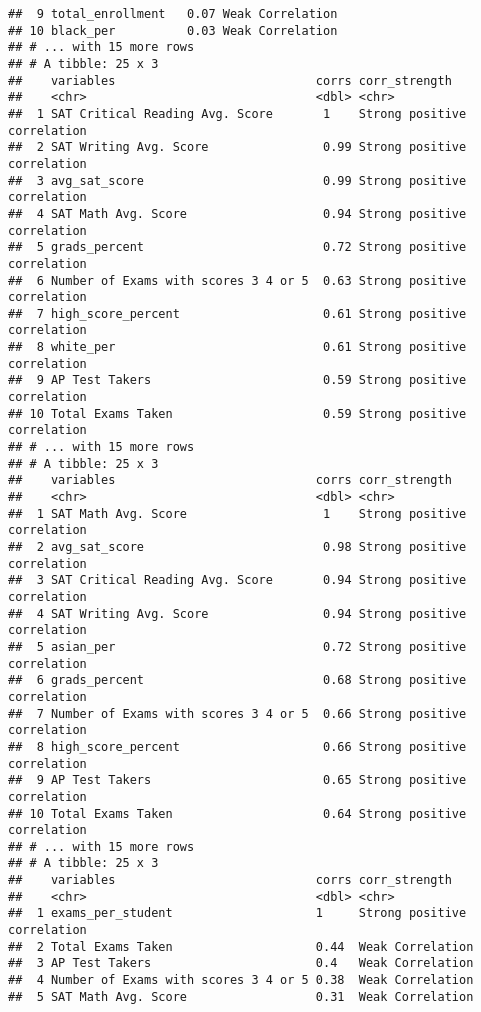 \documentclass[]{article}
\begin{document}
\begin{verbatim}
##  9 total_enrollment   0.07 Weak Correlation           
## 10 black_per          0.03 Weak Correlation           
## # ... with 15 more rows
## # A tibble: 25 x 3
##    variables                            corrs corr_strength              
##    <chr>                                <dbl> <chr>                      
##  1 SAT Critical Reading Avg. Score       1    Strong positive correlation
##  2 SAT Writing Avg. Score                0.99 Strong positive correlation
##  3 avg_sat_score                         0.99 Strong positive correlation
##  4 SAT Math Avg. Score                   0.94 Strong positive correlation
##  5 grads_percent                         0.72 Strong positive correlation
##  6 Number of Exams with scores 3 4 or 5  0.63 Strong positive correlation
##  7 high_score_percent                    0.61 Strong positive correlation
##  8 white_per                             0.61 Strong positive correlation
##  9 AP Test Takers                        0.59 Strong positive correlation
## 10 Total Exams Taken                     0.59 Strong positive correlation
## # ... with 15 more rows
## # A tibble: 25 x 3
##    variables                            corrs corr_strength              
##    <chr>                                <dbl> <chr>                      
##  1 SAT Math Avg. Score                   1    Strong positive correlation
##  2 avg_sat_score                         0.98 Strong positive correlation
##  3 SAT Critical Reading Avg. Score       0.94 Strong positive correlation
##  4 SAT Writing Avg. Score                0.94 Strong positive correlation
##  5 asian_per                             0.72 Strong positive correlation
##  6 grads_percent                         0.68 Strong positive correlation
##  7 Number of Exams with scores 3 4 or 5  0.66 Strong positive correlation
##  8 high_score_percent                    0.66 Strong positive correlation
##  9 AP Test Takers                        0.65 Strong positive correlation
## 10 Total Exams Taken                     0.64 Strong positive correlation
## # ... with 15 more rows
## # A tibble: 25 x 3
##    variables                            corrs corr_strength              
##    <chr>                                <dbl> <chr>                      
##  1 exams_per_student                    1     Strong positive correlation
##  2 Total Exams Taken                    0.44  Weak Correlation           
##  3 AP Test Takers                       0.4   Weak Correlation           
##  4 Number of Exams with scores 3 4 or 5 0.38  Weak Correlation           
##  5 SAT Math Avg. Score                  0.31  Weak Correlation           

\end{verbatim}
\end{document}
